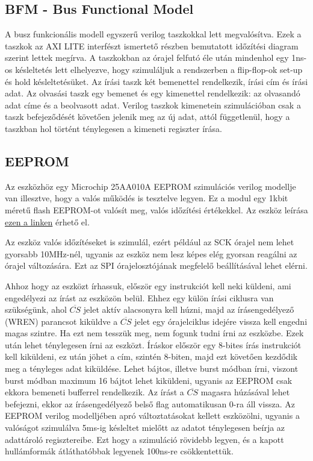 \documentclass[a4paper,11pt]{article}
\begin{document}
\subsection{BFM - Bus Functional Model}
A busz funkcionális modell egyszerű verilog taszkokkal lett megvalósítva. Ezek a taszkok az AXI LITE interfészt ismertető részben bemutatott időzítési diagram szerint lettek megírva. A taszkokban az órajel felfutó éle után mindenhol egy 1ns-os késleltetés lett elhelyezve, hogy szimuláljuk a rendszerben a flip-flop-ok set-up és hold késleltetésüket. Az írási taszk két bemenettel rendelkezik, írási cím és írási adat. Az olvasási taszk egy bemenet és egy kimenettel rendelkezik: az olvasandó adat címe és a beolvasott adat. Verilog taszkok kimenetein szimulációban csak a taszk befejeződését követően jelenik meg az új adat, attól függetlenül, hogy a taszkban hol történt ténylegesen a kimeneti regiszter írása.

\subsection{EEPROM}
Az eszközhöz egy Microchip 25AA010A EEPROM szimulációs verilog modellje van illesztve, hogy a valós működés is tesztelve legyen. Ez a modul egy 1kbit méretű flash EEPROM-ot valósít meg, valós időzítési értékekkel. Az eszköz leírása \href{http://ww1.microchip.com/downloads/en/DeviceDoc/21832H.pdf}{ezen a linken} érhető el.

Az eszköz valós időzítéseket is szimulál, ezért például az SCK órajel nem lehet gyorsabb 10MHz-nél, ugyanis az eszköz nem lesz képes elég gyorsan reagálni az órajel változására. Ezt az SPI órajelosztójának megfelelő beállításával lehet elérni.

Ahhoz hogy az eszközt írhassuk, először egy instrukciót kell neki küldeni, ami engedélyezi az írást az eszközön belül. Ehhez egy külön írási ciklusra van szükségünk, ahol $\overline{CS}$ jelet aktív alacsonyra kell húzni, majd az írásengedélyező (WREN) parancsot kiküldve a $\overline{CS}$ jelet egy órajelciklus idejére vissza kell engedni magas szintre. Ha ezt nem tesszük meg, nem fogunk tudni írni az eszközbe. Ezek után lehet ténylegesen írni az eszközt. Íráskor először egy 8-bites írás instrukciót kell kiküldeni, ez után jöhet a cím, szintén 8-biten, majd ezt követően kezdődik meg a tényleges adat kiküldése. Lehet bájtos, illetve burst módban írni, viszont burst módban maximum 16 bájtot lehet kiküldeni, ugyanis az EEPROM csak ekkora bemeneti bufferrel rendelkezik. Az írást a $\overline{CS}$ magasra húzásával lehet befejezni, ekkor az írásengedélyező belső flag automatikusan 0-ra áll vissza. Az EEPROM verilog modelljében apró változtatásokat kellett eszközölni, ugyanis a valóságot szimulálva 5ms-ig késleltet mielőtt az adatot ténylegesen beírja az adattároló regisztereibe. Ezt hogy a szimuláció rövidebb legyen, és a kapott hullámformák átláthatóbbak legyenek 100ns-re csökkentettük.
\end{document}
